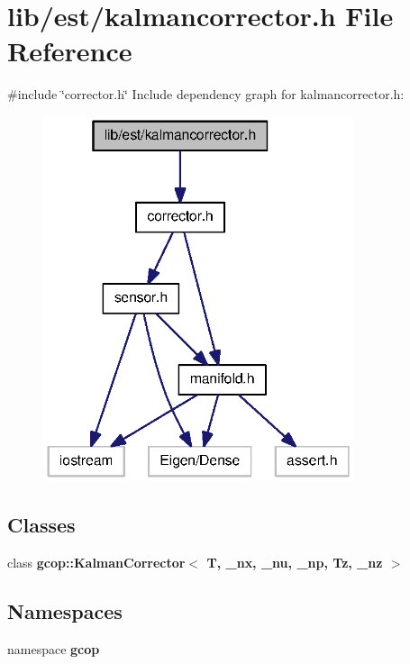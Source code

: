 \section{lib/est/kalmancorrector.h \-File \-Reference}
\label{kalmancorrector_8h}
{\ttfamily \#include \char`\"{}corrector.\-h\char`\"{}}\*
\-Include dependency graph for kalmancorrector.\-h\-:
\nopagebreak
\begin{figure}[H]
\begin{center}
\leavevmode
\includegraphics[width=258pt]{kalmancorrector_8h__incl}
\end{center}
\end{figure}
\subsection*{\-Classes}
\begin{DoxyCompactItemize}
\item 
class {\bf gcop\-::\-Kalman\-Corrector$<$ T, \-\_\-nx, \-\_\-nu, \-\_\-np, Tz, \-\_\-nz $>$}
\end{DoxyCompactItemize}
\subsection*{\-Namespaces}
\begin{DoxyCompactItemize}
\item 
namespace {\bf gcop}
\end{DoxyCompactItemize}
